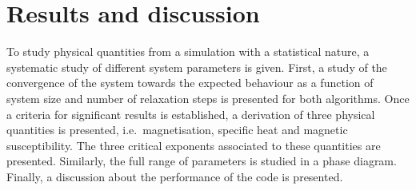 \documentclass[pra,aps,superscriptaddress,amssymb,amsmath,reprint,noeprint,floatfix]{revtex4-2}
\begin{document}
\section{\label{sec:resultsanddiscussion}Results and discussion}
To study physical quantities from a simulation with a statistical nature, a systematic study of different system parameters is given. First, a study of the convergence of the system towards the expected behaviour as a function of system size and number of relaxation steps is presented for both algorithms. Once a criteria for significant results is established, a derivation of three physical quantities is presented, i.e.\ magnetisation, specific heat and magnetic susceptibility. The three critical exponents associated to these quantities are presented. Similarly, the full range of parameters is studied in a phase diagram. Finally, a discussion about the performance of the code is presented.
\end{document}
